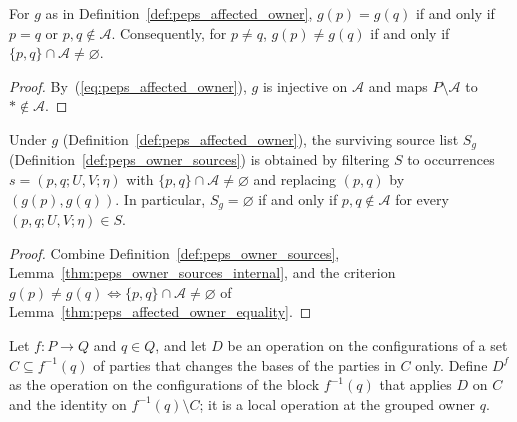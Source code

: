 \begin{lemma}
    \label{thm:peps_affected_owner_equality}
    \leanok
    For $g$ as in Definition~\ref{def:peps_affected_owner}, $g(p)=g(q)$ if and
    only if $p=q$ or $p,q\notin\mathcal A$. Consequently, for $p\neq q$,
    $g(p)\neq g(q)$ if and only if $\{p,q\}\cap\mathcal A\neq\varnothing$.
\end{lemma}

\begin{proof}
    \leanok
    By~(\ref{eq:peps_affected_owner}), $g$ is injective on $\mathcal A$ and maps
    $P\setminus\mathcal A$ to $*\notin\mathcal A$.
\end{proof}

\begin{lemma}
    \label{thm:peps_affected_source_occurrences}
    \leanok
    Under $g$ (Definition~\ref{def:peps_affected_owner}), the surviving source
    list $S_g$ (Definition~\ref{def:peps_owner_sources}) is obtained by
    filtering $S$ to occurrences $s=(p,q;U,V;\eta)$ with
    $\{p,q\}\cap\mathcal A\neq\varnothing$ and replacing $(p,q)$ by
    $(g(p),g(q))$. In particular, $S_g=\varnothing$ if and only if
    $p,q\notin\mathcal A$ for every $(p,q;U,V;\eta)\in S$.
\end{lemma}

\begin{proof}
    \leanok
    Combine Definition~\ref{def:peps_owner_sources},
    Lemma~\ref{thm:peps_owner_sources_internal}, and the criterion
    $g(p)\neq g(q)\iff\{p,q\}\cap\mathcal A\neq\varnothing$ of
    Lemma~\ref{thm:peps_affected_owner_equality}.
\end{proof}

\begin{definition}
    \label{def:peps_grouped_block_map}
    \leanok
    Let $f:P\to Q$ and $q\in Q$, and let $D$ be an operation on the
    configurations of a set $C\subseteq f^{-1}(q)$ of parties that changes the
    bases of the parties in $C$ only. Define $D^f$ as the operation on the
    configurations of the block $f^{-1}(q)$ that applies $D$ on $C$ and the
    identity on $f^{-1}(q)\setminus C$; it is a local operation at the grouped
    owner $q$.
\end{definition}

